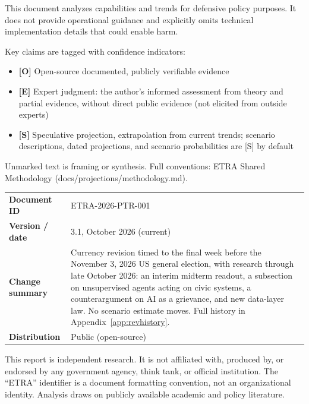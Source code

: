 \documentclass[11pt,letterpaper]{article}
\begin{document}
\begin{warnbox}
This document analyzes capabilities and trends for defensive policy purposes. It does not provide operational guidance and explicitly omits technical implementation details that could enable harm.
\end{warnbox}

\begin{defbox}
Key claims are tagged with confidence indicators:
\begin{itemize}[nosep]
  \item \textbf{[O]} Open-source documented, publicly verifiable evidence
  \item \textbf{[E]} Expert judgment: the author's informed assessment from theory and partial evidence, without direct public evidence (not elicited from outside experts)
  \item \textbf{[S]} Speculative projection, extrapolation from current trends; scenario descriptions, dated projections, and scenario probabilities are [S] by default
\end{itemize}
Unmarked text is framing or synthesis. Full conventions: ETRA Shared Methodology (docs/projections/methodology.md).
\end{defbox}

\begin{defbox}
\small
\begin{tabular}{@{}p{3.1cm}p{11.4cm}@{}}
\textbf{Document ID} & ETRA-2026-PTR-001 \\
\textbf{Version / date} & 3.1, October 2026 (current) \\
\textbf{Change summary} & Currency revision timed to the final week before the November 3, 2026 US general election, with research through late October 2026: an interim midterm readout, a subsection on unsupervised agents acting on civic systems, a counterargument on AI as a grievance, and new data-layer law. No scenario estimate moves. Full history in Appendix~\ref{app:revhistory}. \\
\textbf{Distribution} & Public (open-source) \\
\end{tabular}
\end{defbox}

\begin{infobox}
This report is independent research. It is not affiliated with, produced by, or endorsed by any government agency, think tank, or official institution. The ``ETRA'' identifier is a document formatting convention, not an organizational identity. Analysis draws on publicly available academic and policy literature.
\end{infobox}
\end{document}
